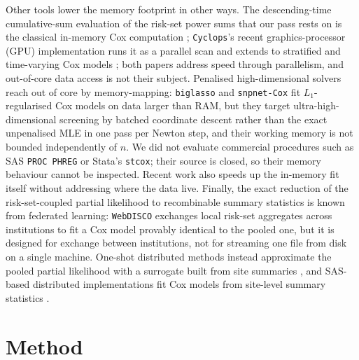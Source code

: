 \documentclass[11pt,a4paper]{article}
\begin{document}
Other tools lower the memory footprint in other ways. The descending-time
cumulative-sum evaluation of the risk-set power sums that our pass rests on is
the classical in-memory Cox computation \citep{therneau2000modeling};
\texttt{Cyclops}'s recent graphics-processor (GPU) implementation runs it as a
parallel scan \citep{yang2023massive} and extends to stratified and
time-varying Cox models \citep{yang2023gpu}; both papers address speed through
parallelism, and out-of-core data access is not their subject.
Penalised high-dimensional
solvers reach out of
core by memory-mapping: \texttt{biglasso} \citep{zeng2021biglasso} and
\texttt{snpnet-Cox} \citep{li2022snpnet} fit $L_1$-regularised Cox models on data
larger than RAM, but they target ultra-high-dimensional screening by batched
coordinate descent rather than the exact unpenalised MLE in one pass per
Newton step, and their working memory is not bounded
independently of $n$. We did not evaluate commercial procedures such as SAS
\texttt{PROC PHREG} or Stata's \texttt{stcox}; their source is closed, so their
memory behaviour cannot be inspected. Recent work also speeds up the in-memory
fit itself \citep{liu2024fastsurvival} without addressing where the data live.
Finally, the exact reduction of the risk-set-coupled partial likelihood to
recombinable summary statistics is known from federated learning:
\texttt{WebDISCO} \citep{lu2015webdisco} exchanges local risk-set aggregates
across institutions to fit a Cox model provably identical to the pooled one,
but it is designed for exchange between institutions, not for streaming one
file from disk on a single machine. One-shot distributed methods instead
approximate the pooled partial likelihood with a surrogate built from site
summaries \citep{duan2020odac}, and SAS-based distributed implementations fit
Cox models from site-level summary statistics \citep{vilk2018sas}.

\section{Method}
\label{sec:method}
\end{document}
